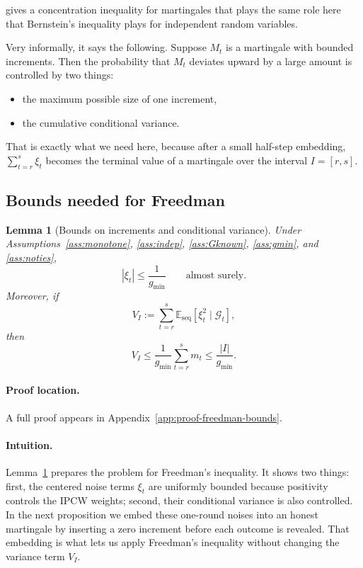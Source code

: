 \documentclass[11pt]{article}
\newtheorem{lemma}{Lemma}
\newcommand{\E}{\mathbb{E}}
\newcommand{\1}{\mathbf{1}}
\newcommand{\seq}{\mathrm{seq}}
\newcommand{\cG}{\mathcal{G}}
\begin{document}
\citet{Freedman1975} gives a concentration inequality for martingales that plays the same role here that Bernstein's inequality plays for independent random variables.

Very informally, it says the following. Suppose $M_t$ is a martingale with bounded increments. Then the probability that $M_t$ deviates upward by a large amount is controlled by two things:
\begin{itemize}[leftmargin=*,itemsep=2pt]
  \item the maximum possible size of one increment,
  \item the cumulative conditional variance.
\end{itemize}

That is exactly what we need here, because after a small half-step embedding, $\sum_{t=r}^s \xi_t$ becomes the terminal value of a martingale over the interval $I=[r,s]$.

\subsection{Bounds needed for Freedman}

\begin{lemma}[Bounds on increments and conditional variance]
\label{lem:freedman-bounds}
Under Assumptions~\ref{ass:monotone}, \ref{ass:indep}, \ref{ass:Gknown}, \ref{ass:gmin}, and \ref{ass:noties},
\[
|\xi_t|\le \frac{1}{g_{\min}}
\qquad\text{almost surely.}
\]
Moreover, if
\[
V_I:=\sum_{t=r}^s \E_{\seq}[\xi_t^2\mid \cG_t],
\]
then
\[
V_I\le \frac{1}{g_{\min}}\sum_{t=r}^s m_t \le \frac{|I|}{g_{\min}}.
\]
\end{lemma}

\paragraph{Proof location.} A full proof appears in Appendix~\ref{app:proof-freedman-bounds}.


\paragraph{Intuition.} Lemma~\ref{lem:freedman-bounds} prepares the problem for Freedman's inequality. It shows two things: first, the centered noise terms $\xi_t$ are uniformly bounded because positivity controls the IPCW weights; second, their conditional variance is also controlled. In the next proposition we embed these one-round noises into an honest martingale by inserting a zero increment before each outcome is revealed. That embedding is what lets us apply Freedman's inequality without changing the variance term $V_I$.
\end{document}

